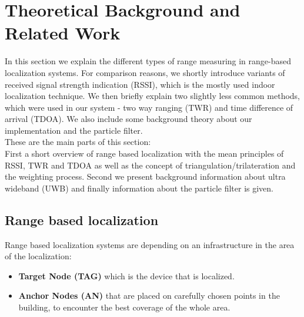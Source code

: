 
\chapter{Theoretical Background and Related Work} %

\label{Chapter2} %
In this section we explain the different types of range measuring in range-based localization systems. For comparison reasons, we shortly introduce variants of received signal strength indication (RSSI), which is the mostly used indoor localization technique. We then briefly explain two slightly less common methods, which were used in our system - two way ranging (TWR) and time difference of arrival (TDOA). We also include some background theory about our implementation and the particle filter.\\
These are the main parts of this section:\\
First a short overview of range based localization with the mean principles of RSSI, TWR and TDOA as well as the concept of triangulation/trilateration and the weighting process. Second we present background information about ultra wideband (UWB) and finally information about the particle filter is given.


\section{Range based localization}

Range based localization systems are depending on an infrastructure in the area of the localization:
\begin{itemize} 
\item \textbf{Target Node (TAG)} which is the device that is localized. 
\item \textbf{Anchor Nodes (AN)} that are placed on carefully chosen points in the building, to encounter the best coverage of the whole area.
\end{itemize}

